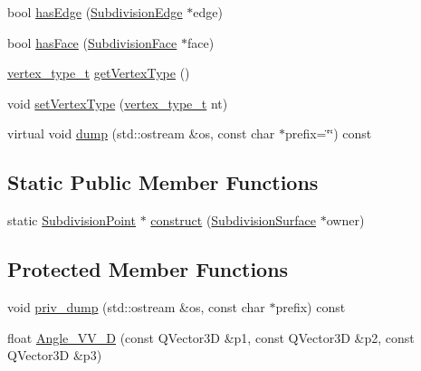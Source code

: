 \begin{DoxyCompactItemize}
\item 
bool \hyperlink{classShipCADGeometry_1_1SubdivisionPoint_ada0d082be616958c024bb1743d392e2f}{has\-Edge} (\hyperlink{classShipCADGeometry_1_1SubdivisionEdge}{Subdivision\-Edge} $\ast$edge)
\item 
bool \hyperlink{classShipCADGeometry_1_1SubdivisionPoint_a720d2fc986ba8a365e8722e0e3e28be5}{has\-Face} (\hyperlink{classShipCADGeometry_1_1SubdivisionFace}{Subdivision\-Face} $\ast$face)
\item 
\hyperlink{classShipCADGeometry_1_1SubdivisionPoint_a03df9289cd8543cd3a567fa6c8e44c43}{vertex\-\_\-type\-\_\-t} \hyperlink{classShipCADGeometry_1_1SubdivisionPoint_aca81609903ccd333db7f6f5f48d569ed}{get\-Vertex\-Type} ()
\item 
void \hyperlink{classShipCADGeometry_1_1SubdivisionPoint_a21d0f7b28fb19cb9f8d905c5f6eb9110}{set\-Vertex\-Type} (\hyperlink{classShipCADGeometry_1_1SubdivisionPoint_a03df9289cd8543cd3a567fa6c8e44c43}{vertex\-\_\-type\-\_\-t} nt)
\item 
virtual void \hyperlink{classShipCADGeometry_1_1SubdivisionPoint_aed72cf5e8dc67e980010d195f3a376a3}{dump} (std\-::ostream \&os, const char $\ast$prefix=\char`\"{}\char`\"{}) const 
\end{DoxyCompactItemize}
\subsection*{Static Public Member Functions}
\begin{DoxyCompactItemize}
\item 
static \hyperlink{classShipCADGeometry_1_1SubdivisionPoint}{Subdivision\-Point} $\ast$ \hyperlink{classShipCADGeometry_1_1SubdivisionPoint_a8e907cca747b0483374d4fdde8eb4ad1}{construct} (\hyperlink{classShipCADGeometry_1_1SubdivisionSurface}{Subdivision\-Surface} $\ast$owner)
\end{DoxyCompactItemize}
\subsection*{Protected Member Functions}
\begin{DoxyCompactItemize}
\item 
void \hyperlink{classShipCADGeometry_1_1SubdivisionPoint_aa2d85a086268f335eefeaef0b48a96a1}{priv\-\_\-dump} (std\-::ostream \&os, const char $\ast$prefix) const 
\item 
float \hyperlink{classShipCADGeometry_1_1SubdivisionPoint_a72061d495903d8265f33bada30a0c416}{Angle\-\_\-\-V\-V\-\_\-D} (const Q\-Vector3\-D \&p1, const Q\-Vector3\-D \&p2, const Q\-Vector3\-D \&p3)
\end{DoxyCompactItemize}
